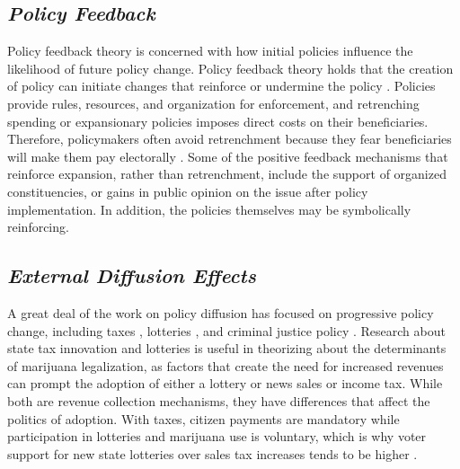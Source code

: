 
\subsection{\it{Policy Feedback}}

Policy feedback theory is concerned with how initial policies influence the likelihood of future policy change. Policy feedback theory holds that the creation of policy can initiate changes that reinforce or undermine the policy \citep{pierson_2000,skocpol_1992}. Policies provide rules, resources, and organization for enforcement, and retrenching spending or expansionary policies imposes direct costs on their beneficiaries. Therefore, policymakers often avoid retrenchment because they fear beneficiaries will make them pay electorally \citep{pierson_1996}. Some of the positive feedback mechanisms that reinforce expansion, rather than retrenchment, include the support of organized constituencies, or gains in public opinion on the issue after policy implementation. In addition, the policies themselves may be symbolically reinforcing. 



\subsection{\it{External Diffusion Effects}}

A great deal of the work on policy diffusion has focused on progressive policy change, including taxes \citep{mikesell_and_zorn_1986}, lotteries \citep{berry_and_berry_1990}, and criminal justice policy \citep{boushey_2016}. Research about state tax innovation and lotteries is useful in theorizing about the determinants of marijuana legalization, as factors that create the need for increased revenues can prompt the adoption of either a lottery or news sales or income tax. While both are revenue collection mechanisms, they have differences that affect the politics of adoption. With taxes, citizen payments are mandatory while participation in lotteries and marijuana use is voluntary, which is why voter support for new state lotteries over sales tax increases tends to be higher \citep{mikesell_and_zorn_1986}. 


